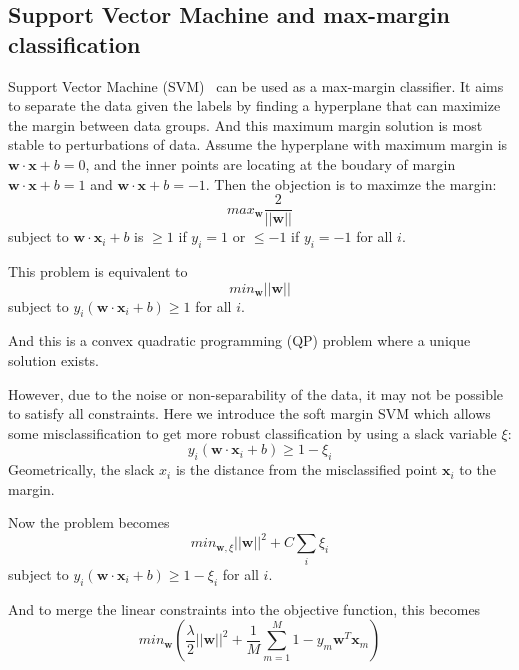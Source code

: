 \documentclass[11pt]{article}
\begin{document}
\subsection{Support Vector Machine and max-margin classification}
Support Vector Machine (SVM)~\cite{noble2006support} can be used as a max-margin classifier. It aims to separate the data given the labels by finding a hyperplane that can maximize the margin between data groups. And this maximum margin solution is most stable to perturbations of data. Assume the hyperplane with maximum margin is $\textbf{w} \cdot \textbf{x} + b = 0$, and the inner points are locating at the boudary of margin $\textbf{w} \cdot \textbf{x} + b = 1$ and $\textbf{w} \cdot \textbf{x} + b = -1$. Then the objection is to maximze the margin:\newpage
\begin{equation}
    max_{\textbf{w}} \frac{2}{||\textbf{w}||}
\end{equation}
subject to $\textbf{w} \cdot \textbf{x}_i + b$ is $\geq 1$ if $y_i = 1$ or $\leq -1$ if $y_i = -1$ for all $i$.

This problem is equivalent to 
\begin{equation}
    min_{\textbf{w}} ||\textbf{w}||
\end{equation}
subject to $y_i (\textbf{w}\cdot \textbf{x}_i + b) \geq 1$ for all $i$. 

And this is a convex quadratic programming (QP) problem where a unique solution exists.

However, due to the noise or non-separability of the data, it may not be possible to satisfy all constraints. Here we introduce the soft margin SVM which allows some misclassification to get more robust classification by using a slack variable $\xi$:
\begin{equation}
    y_i (\textbf{w} \cdot \textbf{x}_i + b) \geq 1 - \xi_i
\end{equation}
Geometrically, the slack $x_i$ is the distance from the misclassified point $\textbf{x}_i$ to the margin.

Now the problem becomes
\begin{equation}
    min_{\textbf{w},\xi} ||\textbf{w}||^2 + C \sum_{i} \xi_i
\end{equation}
subject to $y_i (\textbf{w}\cdot \textbf{x}_i + b) \geq 1 - \xi_i$ for all $i$.

And to merge the linear constraints into the objective function, this becomes
\begin{equation}
    min_{\textbf{w}} (\frac{\lambda}{2}||\textbf{w}||^2 + \frac{1}{M} \sum_{m=1}^{M} 1 - y_m \textbf{w}^T \textbf{x}_m)
\end{equation}
\end{document}
